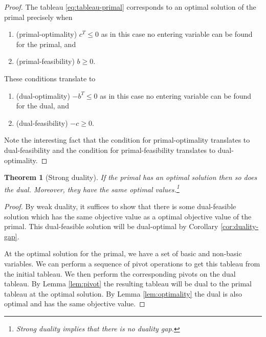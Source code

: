 \documentclass[
]{book}
\providecommand{\tightlist}{%
  \setlength{\itemsep}{0pt}\setlength{\parskip}{0pt}}
\newtheorem{theorem}{Theorem}[chapter]
\theoremstyle{definition}
\theoremstyle{definition}
\theoremstyle{definition}
\theoremstyle{definition}
\theoremstyle{remark}
\begin{document}
\begin{proof}
The tableau \eqref{eq:tableau-primal} corresponds to an optimal solution of the primal precisely when

\begin{enumerate}
\def\labelenumi{\arabic{enumi}.}
\tightlist
\item
  (primal-optimality) \(c^T \le 0\) as in this case no entering variable can be found for the primal, and
\item
  (primal-feasibility) \(b \ge 0\).
\end{enumerate}

These conditions translate to

\begin{enumerate}
\def\labelenumi{\arabic{enumi}.}
\tightlist
\item
  (dual-optimality) \(-b^T \le 0\) as in this case no entering variable can be found for the dual, and
\item
  (dual-feasibility) \(-c \ge 0\).
\end{enumerate}

Note the interesting fact that the condition for primal-optimality translates to dual-feasibility
and the condition for primal-feasibility translates to dual-optimality.
\end{proof}

\begin{theorem}[Strong duality]
\protect\hypertarget{thm:strong-duality}{}\label{thm:strong-duality}If the primal has an optimal solution then so does the dual. Moreover, they have the same optimal
values.\footnote{Strong duality implies that there is no duality gap.}
\end{theorem}

\begin{proof}
By weak duality, it suffices to show that there is some dual-feasible solution which has the same
objective value as a optimal objective value of the primal. This dual-feasible solution will be
dual-optimal by Corollary \ref{cor:duality-gap}.

At the optimal solution for the primal, we have a set of basic and non-basic variables. We can
perform a sequence of pivot operations to get this tableau from the initial tableau. We then perform
the corresponding pivots on the dual tableau. By Lemma \ref{lem:pivot} the resulting tableau will
be dual to the primal tableau at the optimal solution. By Lemma \ref{lem:optimality} the dual is
also optimal and has the same objective value.
\end{proof}
\end{document}
